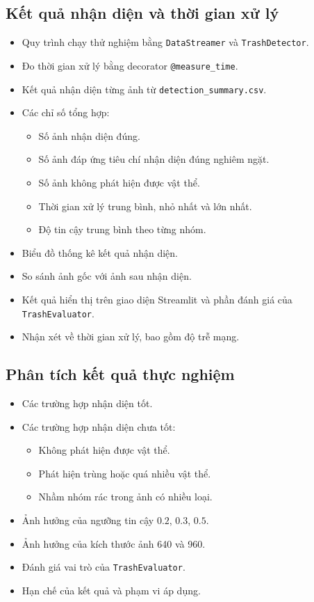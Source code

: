 \documentclass[a4paper,13pt]{extarticle}
\begin{document}
\subsection { Kết quả nhận diện và thời gian xử lý}
\begin{itemize}
    \item Quy trình chạy thử nghiệm bằng \texttt{DataStreamer} và \texttt{TrashDetector}.
    \item Đo thời gian xử lý bằng decorator \texttt{@measure\_time}.
    \item Kết quả nhận diện từng ảnh từ \texttt{detection\_summary.csv}.
    \item Các chỉ số tổng hợp:
    \begin{itemize}
        \item Số ảnh nhận diện đúng.
        \item Số ảnh đáp ứng tiêu chí nhận diện đúng nghiêm ngặt.
        \item Số ảnh không phát hiện được vật thể.
        \item Thời gian xử lý trung bình, nhỏ nhất và lớn nhất.
        \item Độ tin cậy trung bình theo từng nhóm.
    \end{itemize}
    \item Biểu đồ thống kê kết quả nhận diện.
    \item So sánh ảnh gốc với ảnh sau nhận diện.
    \item Kết quả hiển thị trên giao diện Streamlit và phần đánh giá của \texttt{TrashEvaluator}.
    \item Nhận xét về thời gian xử lý, bao gồm độ trễ mạng.
\end{itemize}

\subsection { Phân tích kết quả thực nghiệm}
\begin{itemize}
    \item Các trường hợp nhận diện tốt.
    \item Các trường hợp nhận diện chưa tốt:
    \begin{itemize}
        \item Không phát hiện được vật thể.
        \item Phát hiện trùng hoặc quá nhiều vật thể.
        \item Nhầm nhóm rác trong ảnh có nhiều loại.
    \end{itemize}
    \item Ảnh hưởng của ngưỡng tin cậy $0.2$, $0.3$, $0.5$.
    \item Ảnh hưởng của kích thước ảnh 640 và 960.
    \item Đánh giá vai trò của \texttt{TrashEvaluator}.
    \item Hạn chế của kết quả và phạm vi áp dụng.
\end{itemize}
\end{document}
